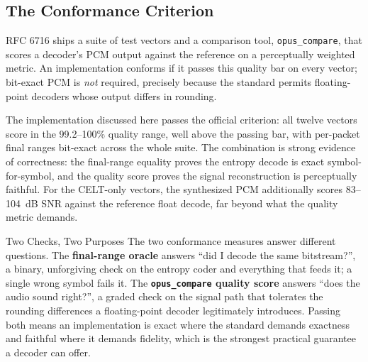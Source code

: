 \subsection{The Conformance Criterion}\label{subsec:conformance}

RFC 6716 ships a suite of test vectors and a comparison tool,
\texttt{opus\_compare}, that scores a decoder's PCM output against the reference
on a perceptually weighted metric. An implementation conforms if it passes this
quality bar on every vector; bit-exact PCM is \emph{not} required, precisely
because the standard permits floating-point decoders whose output differs in
rounding.

The implementation discussed here passes the official criterion: all twelve
vectors score in the 99.2--100\% quality range, well above the passing bar, with
per-packet final ranges bit-exact across the whole suite. The combination is
strong evidence of correctness: the final-range equality proves the entropy
decode is exact symbol-for-symbol, and the quality score proves the signal
reconstruction is perceptually faithful. For the CELT-only vectors, the
synthesized PCM additionally scores 83--104~dB SNR against the reference float
decode, far beyond what the quality metric demands.

\begin{concept}{Two Checks, Two Purposes}
  The two conformance measures answer different questions. The
  \textbf{final-range oracle} answers ``did I decode the same bitstream?'', a
  binary, unforgiving check on the entropy coder and everything that feeds it; a
  single wrong symbol fails it. The \textbf{\texttt{opus\_compare} quality
  score} answers ``does the audio sound right?'', a graded check on the signal
  path that tolerates the rounding differences a floating-point decoder
  legitimately introduces. Passing both means an implementation is exact where
  the standard demands exactness and faithful where it demands
  fidelity, which is
  the strongest practical guarantee a decoder can offer.
\end{concept}

